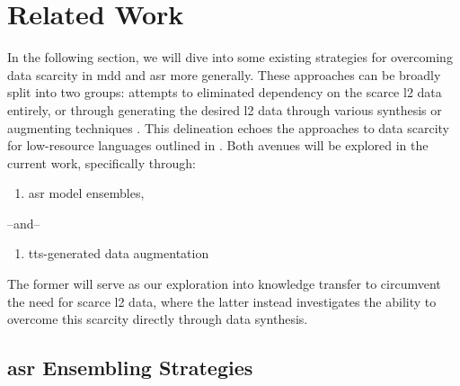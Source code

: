 \documentclass[thesis]{cluu}
\begin{document}
\chapter{Related Work}\label{ch:rw}
In the following section, we will dive into some existing strategies for overcoming data scarcity in \gls{mdd} and \gls{asr} more generally. These approaches can be broadly split into two groups: attempts to eliminated dependency on the scarce \gls{l2} data entirely, or through generating the desired \gls{l2} data through various synthesis or augmenting techniques \parencite{korzekwaWeaklysupervisedWordlevelPronunciation2021}. This delineation echoes the approaches to data scarcity for low-resource languages outlined in . Both avenues will be explored in the current work, specifically through: 
\begin{enumerate}
  \item \gls{asr} model ensembles,
\end{enumerate}
\hspace*{\parindent}--and--
\begin{enumerate}[resume]
  \item \gls{tts}-generated data augmentation
\end{enumerate}
The former will serve as our exploration into knowledge transfer to circumvent the need for scarce \gls{l2} data, where the latter instead investigates the ability to overcome this scarcity directly through data synthesis.
\section{\gls{asr} Ensembling Strategies}\label{sec:ensemble}

\end{document}
